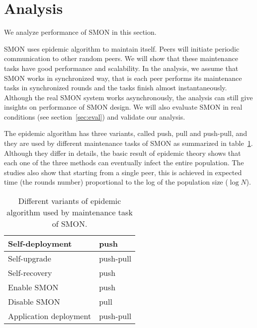 \section{Analysis}
\label{sec:analysis}

We analyze performance of SMON in this section.

SMON uses epidemic algorithm to maintain itself. Peers will
initiate periodic communication to other random peers. We
will show that these maintenance tasks have good
performance and scalability. In the analysis, we assume that
SMON works in synchronized way, that is each peer performs
its maintenance tasks in synchronized rounds and the tasks
finish almost instantaneously. Although the real SMON system
works asynchronously, the analysis can still give insights
on performance of SMON design. We will also evaluate SMON in
real conditions (see section~\ref{sec:eval}) and validate
our analysis.


The epidemic algorithm has three variants, called push, pull
and push-pull, and they are used by different maintenance
tasks of SMON as summarized in table~\ref{tbl:tasks}.
Although they differ in details, the basic result of
epidemic theory shows that each one of the three methods can
eventually infect the entire population.  The studies also
show that starting from a single peer, this is achieved in
expected time (the rounds number) proportional to the log of
the population size ($\log N$).

\begin{table}
\centering
\begin{tabular}{|l|l|}

\hline
Self-deployment & push \\

\hline
Self-upgrade & push-pull \\

\hline
Self-recovery & push \\

\hline
Enable SMON & push \\

\hline
Disable SMON & pull \\

\hline
Application deployment & push-pull \\

\hline
\end{tabular}
\caption{Different variants of epidemic algorithm used by
maintenance task of SMON.}
\label{tbl:tasks}
\end{table}


